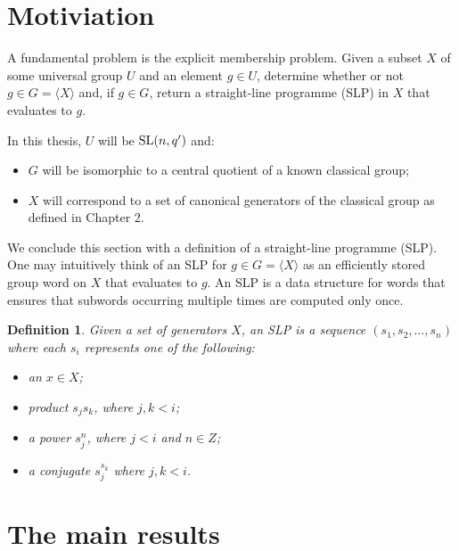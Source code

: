 \documentclass[12pt]{report}
\newtheorem{definition}{Definition}[section]
\def\SL{{\rm SL}}
\begin{document}
\section{Motiviation}

A fundamental problem is the explicit membership problem. Given a subset $X$ of some universal group $U$ and an element $g \in U$, determine whether or not $g \in G = \langle X \rangle$ and, if $g \in G$, return a straight-line programme (SLP) in $X$ that evaluates to $g$.

In this thesis, $U$ will be $\SL(n, q^\prime)$ and:

\begin{itemize}
\item $G$ will be isomorphic to a central quotient of a known classical group;
\item $X$ will correspond to a set of canonical generators of the classical group as defined in Chapter 2.
\end{itemize}

We conclude this section with a definition of a straight-line programme (SLP). One may intuitively think of an SLP for $g \in G = \langle X \rangle$ as an efficiently stored group word on $X$ that evaluates to $g$. An SLP is a data structure for words that ensures that subwords occurring multiple times are computed only once.

\begin{definition}
Given a set of generators $X$, an SLP is a sequence $(s_1, s_2, \ldots , s_n)$ where each $s_i$ represents one of the following:

\begin{itemize}

\item an $x \in X$;

\item product $s_j s_k$, where $j, k < i$;

\item a power $s_j^n$, where $j < i$ and $n \in Z$;

\item a conjugate $s_j^{s_k}$ where $j, k < i$.

\end{itemize}

\end{definition}

\section{The main results}
\end{document}

